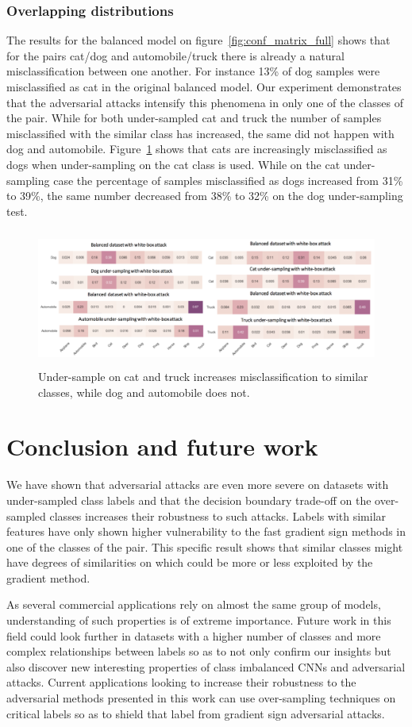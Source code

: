 \documentclass[runningheads,a4paper]{llncs}
\begin{document}
\subsubsection{Overlapping distributions} The results for the balanced model on figure~\ref{fig:conf_matrix_full} shows that for the pairs cat/dog and automobile/truck there is already a natural misclassification between one another. For instance 13\% of dog samples were misclassified as cat in the original balanced model. Our experiment demonstrates that the adversarial attacks intensify this phenomena in only one of the classes of the pair. While for both under-sampled cat and truck the number of samples misclassified with the similar class has increased, the same did not happen with dog and automobile. Figure~\ref{fig:overlap} shows that cats are increasingly misclassified as dogs when under-sampling on the cat class is used. While on the cat under-sampling case the percentage of samples misclassified as dogs increased from 31\% to 39\%, the same number decreased from 38\% to 32\% on the dog under-sampling test.
\begin{figure}
	\centering
	\includegraphics[height=4.5cm]{overlapping_all.png}
	\caption{Under-sample on cat and truck increases misclassification to similar classes, while dog and automobile does not.}
	\label{fig:overlap}
\end{figure}
\section{Conclusion and future work}

We have shown that adversarial attacks are even more severe on datasets with under-sampled class labels and that the decision boundary trade-off on the over-sampled classes increases their robustness to such attacks. Labels with similar features have only shown higher vulnerability to the fast gradient sign methods in one of the classes of the pair. This specific result shows that similar classes might have degrees of similarities on which could be more or less exploited by the gradient method.  

As several commercial applications rely on almost the same group of models, understanding of such properties is of extreme importance. Future work in this field could look further in datasets with a higher number of classes and more complex relationships between labels so as to not only confirm our insights but also discover new interesting properties of class imbalanced CNNs and adversarial attacks. Current applications looking to increase their robustness to the adversarial methods presented in this work can use over-sampling techniques on critical labels so as to shield that label from gradient sign adversarial attacks.



\end{document}
